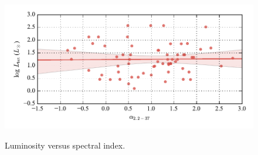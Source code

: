 %
%
%
%






\begin{figure}[!h]
\begin{center}
\includegraphics[width=\textwidth]{Figures/slumVSalpha.pdf}
\label{fig:slumVSalpha}
\vspace{-1cm}
\caption[Luminosity versus spectral index.]{Luminosity versus spectral index.}
\end{center}
\end{figure}



